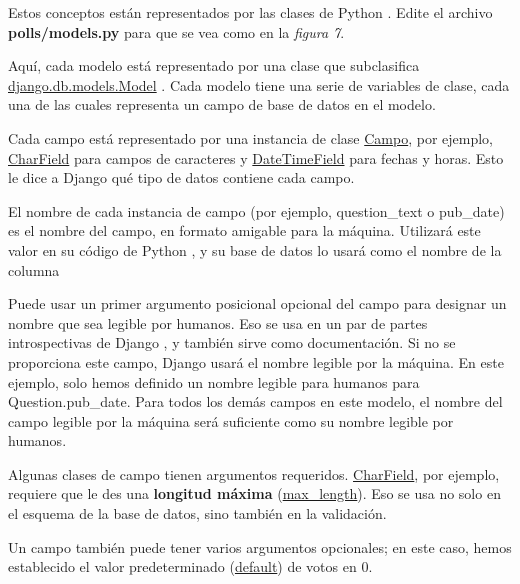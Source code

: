 \documentclass[10pt]{article}
\newcommand{\py}[1]{{\textcolor{B}{Python} #1}}
\newcommand{\django}[1]{{\textcolor{G}{Django} #1}}
\begin{document}
Estos conceptos están representados por las clases de \py. Edite el archivo \textbf{polls/models.py} para que se vea como en la \textit{figura 7}.

Aquí, cada modelo está representado por una clase que subclasifica {\href{https://docs.djangoproject.com/en/3.0/ref/models/instances/\#django.db.models.Model}{\textcolor{B}{django.db.models.Model}}}	. Cada modelo tiene una serie de variables de clase, cada una de las cuales representa un campo de base de datos en el modelo.

Cada campo está representado por una instancia de clase {\href{https://docs.djangoproject.com/en/3.0/ref/models/fields/\#django.db.models.Field}{\textcolor{B}{Campo}}}, por ejemplo, {\href{https://docs.djangoproject.com/en/3.0/ref/models/fields/\#django.db.models.CharField}{\textcolor{B}{CharField}}} para campos de caracteres y {\href{https://docs.djangoproject.com/en/3.0/ref/models/fields/\#django.db.models.DateTimeField}{\textcolor{B}{DateTimeField}}}
 para fechas y horas. Esto le dice a \django{} qué tipo de datos contiene cada campo.

El nombre de cada instancia de campo (por ejemplo, question\_text o pub\_date) es el nombre del campo, en formato amigable para la máquina. Utilizará este valor en su código de \py{}, y su base de datos lo usará como el nombre de la columna

Puede usar un primer argumento posicional opcional del campo para designar un nombre que sea legible por humanos. Eso se usa en un par de partes introspectivas de \django{}, y también sirve como documentación. Si no se proporciona este campo, \django{} usará el nombre legible por la máquina. En este ejemplo, solo hemos definido un nombre legible para humanos para \textcolor{G}{Question.pub\_date}. Para todos los demás campos en este modelo, el nombre del campo legible por la máquina será suficiente como su nombre legible por humanos.

Algunas clases de campo tienen argumentos requeridos. {\href{https://docs.djangoproject.com/en/3.0/ref/models/fields/\#django.db.models.CharField}{\textcolor{B}{CharField}}}, por ejemplo, requiere que le des una \textbf{longitud máxima} ({\href{https://docs.djangoproject.com/en/3.0/ref/models/fields/\#django.db.models.CharField.max_length}{\textcolor{B}{max\_length}}}). Eso se usa no solo en el esquema de la base de datos, sino también en la validación.

Un campo también puede tener varios argumentos opcionales; en este caso, hemos establecido el valor predeterminado ({\href{https://docs.djangoproject.com/en/3.0/ref/models/fields/\#django.db.models.Field.default}{\textcolor{B}{default}}}) de votos en 0.
\end{document}
